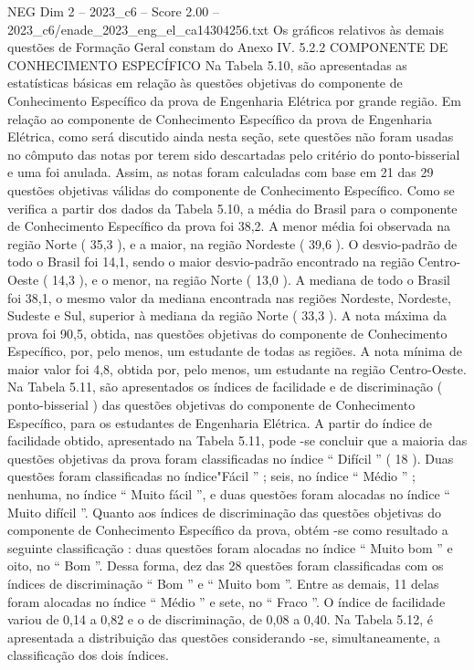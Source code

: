 \begin{textsample}{NEG Dim 2 – 2023\_c6 – Score 2.00 – 2023\_c6/enade\_2023\_eng\_el\_ca14304256.txt}
Os gráficos relativos às demais questões de Formação Geral constam do Anexo IV. 5.2.2 COMPONENTE DE CONHECIMENTO ESPECÍFICO Na Tabela 5.10, são apresentadas as estatísticas básicas em relação às questões objetivas do componente de Conhecimento Específico da prova de Engenharia Elétrica por grande região.
Em relação ao componente de Conhecimento Específico da prova de Engenharia Elétrica, como será discutido ainda nesta seção, sete questões não foram usadas no cômputo das notas por terem sido descartadas pelo critério do ponto-bisserial e uma foi anulada.
Assim, as notas foram calculadas com base em 21 das 29 questões objetivas válidas do componente de Conhecimento Específico.
Como se verifica a partir dos dados da Tabela 5.10, a média do Brasil para o componente de Conhecimento Específico da prova foi 38,2.
A menor média foi observada na região Norte ( 35,3 ), e a maior, na região Nordeste ( 39,6 ).
O desvio-padrão de todo o Brasil foi 14,1, sendo o maior desvio-padrão encontrado na região Centro-Oeste ( 14,3 ), e o menor, na região Norte ( 13,0 ).
A mediana de todo o Brasil foi 38,1, o mesmo valor da mediana encontrada nas regiões Nordeste, Nordeste, Sudeste e Sul, superior à mediana da região Norte ( 33,3 ).
A nota máxima da prova foi 90,5, obtida, nas questões objetivas do componente de Conhecimento Específico, por, pelo menos, um estudante de todas as regiões.
A nota mínima de maior valor foi 4,8, obtida por, pelo menos, um estudante na região Centro-Oeste.
Na Tabela 5.11, são apresentados os índices de facilidade e de discriminação ( ponto-bisserial ) das questões objetivas do componente de Conhecimento Específico, para os estudantes de Engenharia Elétrica.
A partir do índice de facilidade obtido, apresentado na Tabela 5.11, pode -se concluir que a maioria das questões objetivas da prova foram classificadas no índice “ Difícil ” ( 18 ).
Duas questões foram classificadas no índice"Fácil ” ; seis, no índice “ Médio ” ; nenhuma, no índice “ Muito fácil ”, e duas questões foram alocadas no índice “ Muito difícil ”.
Quanto aos índices de discriminação das questões objetivas do componente de Conhecimento Específico da prova, obtém -se como resultado a seguinte classificação : duas questões foram alocadas no índice “ Muito bom ” e oito, no “ Bom ”.
Dessa forma, dez das 28 questões foram classificadas com os índices de discriminação “ Bom ” e “ Muito bom ”.
Entre as demais, 11 delas foram alocadas no índice “ Médio ” e sete, no “ Fraco ”.
O índice de facilidade variou de 0,14 a 0,82 e o de discriminação, de 0,08 a 0,40.
Na Tabela 5.12, é apresentada a distribuição das questões considerando -se, simultaneamente, a classificação dos dois índices.

\end{textsample}

